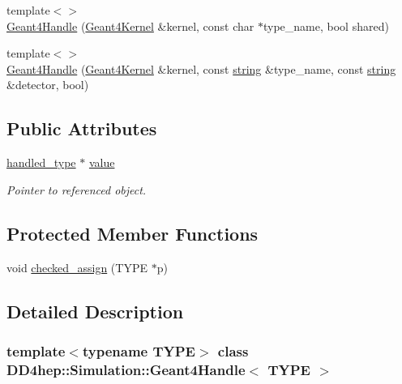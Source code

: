 \begin{DoxyCompactItemize}
\item 
{\footnotesize template$<$$>$ }\\\hyperlink{class_d_d4hep_1_1_simulation_1_1_geant4_handle_ab779480663f611197e91f8e6535dc302}{Geant4Handle} (\hyperlink{class_d_d4hep_1_1_simulation_1_1_geant4_kernel}{Geant4Kernel} \&kernel, const char $\ast$type\_\-name, bool shared)
\item 
{\footnotesize template$<$$>$ }\\\hyperlink{class_d_d4hep_1_1_simulation_1_1_geant4_handle_af19a8f22d0d51e08e686499cc97de3c4}{Geant4Handle} (\hyperlink{class_d_d4hep_1_1_simulation_1_1_geant4_kernel}{Geant4Kernel} \&kernel, const \hyperlink{classstd_1_1string}{string} \&type\_\-name, const \hyperlink{classstd_1_1string}{string} \&detector, bool)
\end{DoxyCompactItemize}
\subsection*{Public Attributes}
\begin{DoxyCompactItemize}
\item 
\hyperlink{class_d_d4hep_1_1_simulation_1_1_geant4_handle_a35e583b9228e38c95d23112ad19b645d}{handled\_\-type} $\ast$ \hyperlink{class_d_d4hep_1_1_simulation_1_1_geant4_handle_a5bd7f10667956413e9aa66cad5ad9d7d}{value}
\begin{DoxyCompactList}\small\item\em Pointer to referenced object. \item\end{DoxyCompactList}\end{DoxyCompactItemize}
\subsection*{Protected Member Functions}
\begin{DoxyCompactItemize}
\item 
void \hyperlink{class_d_d4hep_1_1_simulation_1_1_geant4_handle_a8c1a9d7f4e2f0b7afee56e54e8e61ccf}{checked\_\-assign} (TYPE $\ast$p)
\end{DoxyCompactItemize}


\subsection{Detailed Description}
\subsubsection*{template$<$typename TYPE$>$ class DD4hep::Simulation::Geant4Handle$<$ TYPE $>$}

